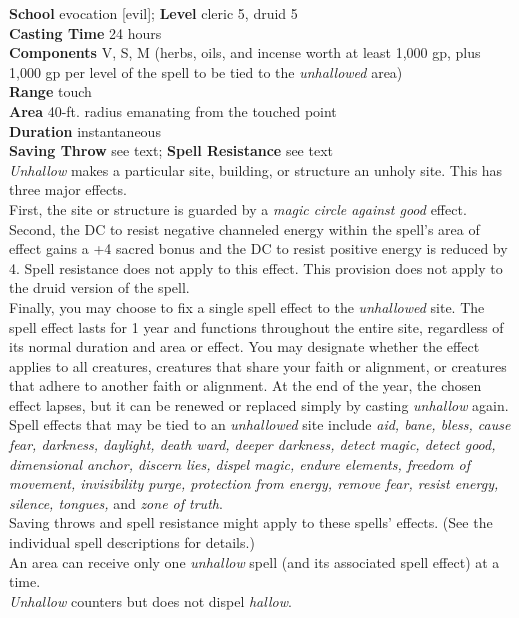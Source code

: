 \textbf{School} evocation [evil]; \textbf{Level} cleric 5, druid 5\\
\textbf{Casting Time} 24 hours\\
\textbf{Components} V, S, M (herbs, oils, and incense worth at least 1,000 gp, plus 1,000 gp per level of the spell to be tied to the \textit{unhallowed }area)\\
\textbf{Range} touch\\
\textbf{Area} 40-ft. radius emanating from the touched point\\
\textbf{Duration} instantaneous\\
\textbf{Saving Throw} see text; \textbf{Spell Resistance} see text\\
\textit{Unhallow }makes a particular site, building, or structure an unholy site. This has three major effects.\\
First, the site or structure is guarded by a \textit{magic circle against good }effect.\\
Second, the DC to resist negative channeled energy within the spell's area of effect gains a +4 sacred bonus and the DC to resist positive energy is reduced by 4. Spell resistance does not apply to this effect. This provision does not apply to the druid version of the spell.\\
Finally, you may choose to fix a single spell effect to the \textit{unhallowed }site. The spell effect lasts for 1 year and functions throughout the entire site, regardless of its normal duration and area or effect. You may designate whether the effect applies to all creatures, creatures that share your faith or alignment, or creatures that adhere to another faith or alignment. At the end of the year, the chosen effect lapses, but it can be renewed or replaced simply by casting \textit{unhallow }again.\\
Spell effects that may be tied to an \textit{unhallowed }site include \textit{aid, bane, bless, cause fear, darkness, daylight, death ward, deeper darkness, detect magic, detect good, dimensional anchor, discern lies, dispel magic, endure elements, freedom of movement, invisibility purge, protection from energy, remove fear, resist energy, silence, tongues, }and \textit{zone of truth}.\\
Saving throws and spell resistance might apply to these spells' effects. (See the individual spell descriptions for details.)\\
An area can receive only one \textit{unhallow }spell (and its associated spell effect) at a time.\\
\textit{Unhallow }counters but does not dispel \textit{hallow}.\\
